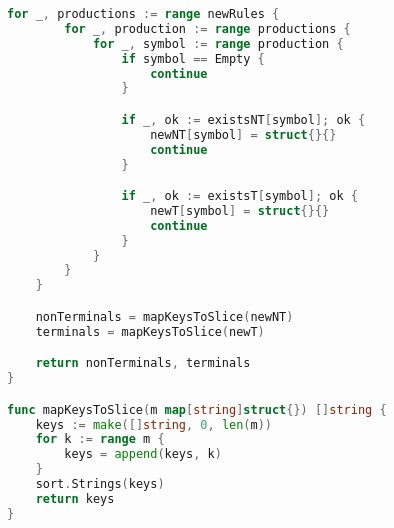 \begin{lstlisting}[language=Go, caption={Код модуля \textit{grammar} --- устранение бесполезных символов}]
	for _, productions := range newRules {
		for _, production := range productions {
			for _, symbol := range production {
				if symbol == Empty {
					continue
				}

				if _, ok := existsNT[symbol]; ok {
					newNT[symbol] = struct{}{}
					continue
				}

				if _, ok := existsT[symbol]; ok {
					newT[symbol] = struct{}{}
					continue
				}
			}
		}
	}

	nonTerminals = mapKeysToSlice(newNT)
	terminals = mapKeysToSlice(newT)

	return nonTerminals, terminals
}

func mapKeysToSlice(m map[string]struct{}) []string {
	keys := make([]string, 0, len(m))
	for k := range m {
		keys = append(keys, k)
	}
	sort.Strings(keys)
	return keys
}
\end{lstlisting}

